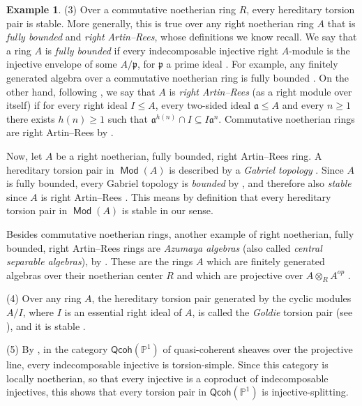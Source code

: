 \documentclass[a4paper,11pt]{amsart}
\theoremstyle{plain}
\theoremstyle{definition}
\newtheorem{ex}[thm]{Example}
\newcommand{\Pbb}{\mathbb{P}} \newcommand{\Qbb}{\mathbb{Q}} \newcommand{\Rbb}{\mathbb{R}}
\DeclareMathOperator{\Mod}{\mathsf{Mod}}
\newcommand{\pf}{\mathfrak{p}}
\begin{document}
\begin{ex}
	(3) Over a commutative noetherian ring $R$, every hereditary torsion pair is
	stable. More generally, this is true over any right noetherian ring $A$ that
	is \emph{fully bounded} and \emph{right Artin--Rees}, whose definitions we know
	recall.
	We say that a ring $A$ is \emph{fully bounded} if every indecomposable injective right
	$A$-module is the injective envelope of some $A/\pf$, for $\pf$ a prime ideal
	\cite[\S VII.2]{sten-75}. For example, any finitely generated algebra over a
	commutative noetherian ring is fully bounded
	\cite[Example~\S{}VII.2.4]{sten-75}. On the other hand, following \cite[\S
	VII.4]{sten-75}, we say that $A$ is \emph{right
	Artin--Rees} (as a right module over itself) if for every right ideal $I\leq
	A$, every two-sided ideal $\mathfrak{a}\leq A$ and every $n\geq 1$ there
	exists $h(n)\geq 1$ such that $\mathfrak{a}^{h(n)}\cap I\subseteq
	I\mathfrak{a}^n$. Commutative noetherian rings are right Artin--Rees by
	\cite[Prop.~VII.4.5]{sten-75}.

	Now, let $A$ be a right noetherian, fully bounded, right Artin--Rees ring. A
	hereditary torsion pair in $\Mod(A)$ is described by a \emph{Gabriel topology}
	\cite{sten-75}. Since $A$ is fully bounded, every Gabriel topology is
	\emph{bounded} by \cite[Thm.~VII.3.4]{sten-75}, and therefore also
	\emph{stable} since $A$ is right Artin--Rees
	\cite[Thm.~VII.4.4(c$\Leftrightarrow$e)]{sten-75}. This means by definition
	\cite[after Prop.~VI.7.1]{sten-75} that every hereditary torsion pair in
	$\Mod(A)$ is stable in our sense.

	Besides commutative noetherian rings, another example of right noetherian,
	fully bounded, right Artin--Rees rings are \emph{Azumaya algebras} (also
	called \emph{central separable algebras}), by
	\cite[Ex.~VII.4.2]{sten-75}.
	These are the rings $A$ which are finitely generated algebras over their noetherian
	center $R$ and which are projective over $A\otimes_R A^{op}$
	\cite{ford-17,ausl-gold-60}.

	(4) Over any ring $A$, the hereditary torsion pair generated by the cyclic
	modules $A/I$, where $I$ is an essential right ideal of $A$, is called the
	\emph{Goldie} torsion pair (see \cite[\S{}VI.6.2]{sten-75}), and it is stable
	\cite[Prop.~VI.7.3]{sten-75}.

	(5) By \cite[Prop.~3.27]{pavo-25a}, in the category $\mathsf{Qcoh}(\Pbb^1)$ of
	quasi-coherent sheaves over the projective line, every indecomposable
	injective is torsion-simple. Since this category
	is locally noetherian, so that every injective is a coproduct of
	indecomposable injectives, this shows that every torsion pair in
	$\mathsf{Qcoh}(\Pbb^1)$ is injective-splitting.
\end{ex}
\end{document}

